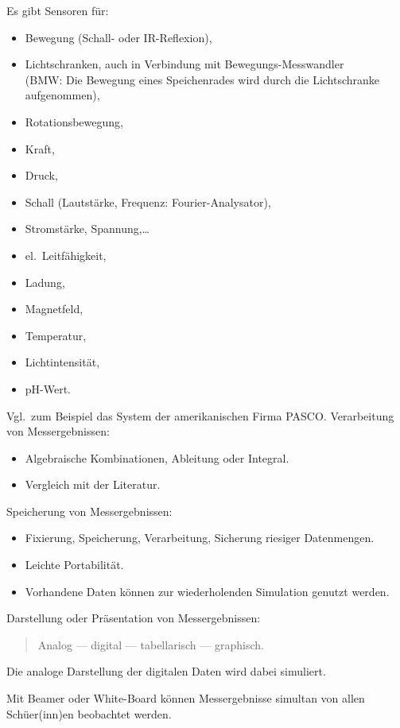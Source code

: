 Es gibt Sensoren f\"{u}r:
\begin{itemize}
\item Bewegung (Schall- oder IR-Reflexion),
\item Lichtschranken, auch in Verbindung mit Bewegungs-Messwandler \\
(BMW: Die Bewegung eines Speichenrades wird durch die Lichtschranke aufgenommen),
\item Rotationsbewegung,
\item Kraft,
\item Druck,
\item Schall (Lautst\"{a}rke, Frequenz: Fourier-Analysator),
\item Stromst\"{a}rke, Spannung,\dots
\item el.\ Leitf\"{a}higkeit,
\item Ladung,
\item Magnetfeld,
\item Temperatur,
\item Lichtintensit\"{a}t,
\item pH-Wert.
\end{itemize}

Vgl.\ zum Beispiel das System der amerikanischen Firma PASCO.
\mip
Verarbeitung von Messergebnissen:
\begin{itemize}
\item Algebraische Kombinationen, Ableitung oder Integral.
\item Vergleich mit der Literatur.
\end{itemize}

\mip
Speicherung von Messergebnissen:
\begin{itemize}
\item Fixierung, Speicherung, Verarbeitung, Sicherung riesiger Datenmengen.
\item Leichte Portabilit\"{a}t.
\item Vorhandene Daten k\"{o}nnen zur wiederholenden Simulation genutzt werden.
\end{itemize}

\mip
Darstellung oder Pr\"{a}sentation von Messergebnissen:
\begin{quote}
Analog --- digital --- tabellarisch --- graphisch.
\end{quote}
Die analoge Darstellung der digitalen Daten wird dabei simuliert.

\mip
Mit Beamer oder White-Board k\"{o}nnen Messergebnisse simultan von allen Sch\"{u}er(inn)en beobachtet werden.


